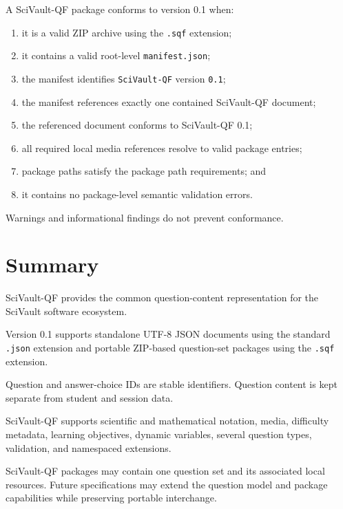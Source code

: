 \documentclass[11pt]{article}
\begin{document}
	A SciVault-QF package conforms to version 0.1 when:
	
	\begin{enumerate}
		\item it is a valid ZIP archive using the \texttt{.sqf} extension;
		\item it contains a valid root-level \texttt{manifest.json};
		\item the manifest identifies \texttt{SciVault-QF} version \texttt{0.1};
		\item the manifest references exactly one contained SciVault-QF document;
		\item the referenced document conforms to SciVault-QF 0.1;
		\item all required local media references resolve to valid package entries;
		\item package paths satisfy the package path requirements; and
		\item it contains no package-level semantic validation errors.
	\end{enumerate}
	
	Warnings and informational findings do not prevent conformance.
	
	\section{Summary}
	
	SciVault-QF provides the common question-content representation for the
	SciVault software ecosystem.
	
	Version 0.1 supports standalone UTF-8 JSON documents using the standard
	\texttt{.json} extension and portable ZIP-based question-set packages using
	the \texttt{.sqf} extension.
	
	Question and answer-choice IDs are stable identifiers.
	Question content is kept separate from student and session data.
	
	SciVault-QF supports scientific and mathematical notation, media,
	difficulty metadata, learning objectives, dynamic variables, several
	question types, validation, and namespaced extensions.
	
	SciVault-QF packages may contain one question set and its associated local
	resources. Future specifications may extend the question model and package
	capabilities while preserving portable interchange.
	
\end{document}
